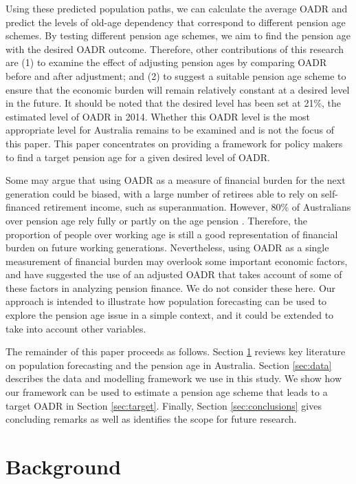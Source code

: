 \documentclass[11pt,a4paper,]{article}
\begin{document}
Using these predicted population paths, we can calculate the average OADR and predict the levels of old-age dependency that correspond to different pension age schemes. By testing different pension age schemes, we aim to find the pension age with the desired OADR outcome. Therefore, other contributions of this research are (1) to examine the effect of adjusting pension ages by comparing OADR before and after adjustment; and (2) to suggest a suitable pension age scheme to ensure that the economic burden will remain relatively constant at a desired level in the future. It should be noted that the desired level has been set at 21\%, the estimated level of OADR in 2014. Whether this OADR level is the most appropriate level for Australia remains to be examined and is not the focus of this paper. This paper concentrates on providing a framework for policy makers to find a target pension age for a given desired level of OADR.

Some may argue that using OADR as a measure of financial burden for the next generation could be biased, with a large number of retirees able to rely on self-financed retirement income, such as superannuation. However, 80\% of Australians over pension age rely fully or partly on the age pension \autocite{Power14}. Therefore, the proportion of people over working age is still a good representation of financial burden on future working generations. Nevertheless, using OADR as a single measurement of financial burden may overlook some important economic factors, and \textcite{HY12} have suggested the use of an adjusted OADR that takes account of some of these factors in analyzing pension finance. We do not consider these here. Our approach is intended to illustrate how population forecasting can be used to explore the pension age issue in a simple context, and it could be extended to take into account other variables.

The remainder of this paper proceeds as follows. Section \ref{sec:litreview} reviews key literature on population forecasting and the pension age in Australia. Section \ref{sec:data} describes the data and modelling framework we use in this study. We show how our framework can be used to estimate a pension age scheme that leads to a target OADR in Section \ref{sec:target}. Finally, Section \ref{sec:conclusions} gives concluding remarks as well as identifies the scope for future research.

\hypertarget{sec:litreview}{%
\section{Background}\label{sec:litreview}}
\end{document}

